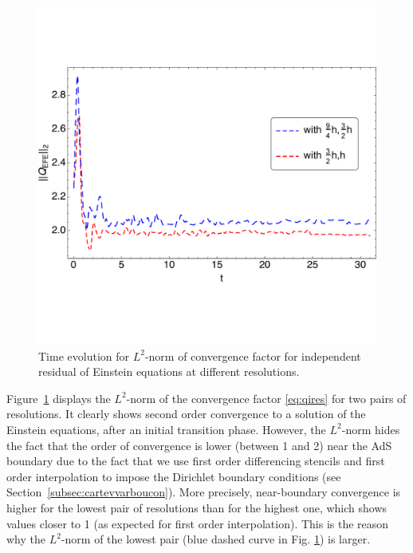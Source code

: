\documentclass[a4paper,11pt]{article}
\numberwithin{equation}{section}
\begin{document}
\begin{figure}[t!]
        \centering
        \includegraphics[width=5.0in,clip=true]{plots/timeseries/L2norm_iresallconvergence/fullplottL2normdim2boundedrescaledconvergenceiresallallres.pdf}
\parbox{5.0in}{\caption{Time evolution for $L^2$-norm of convergence factor for independent residual of Einstein equations at different resolutions.
        }\label{fig:L2norm_iresallconvergence-crop}}
\end{figure}

Figure~\ref{fig:L2norm_iresallconvergence-crop} displays the $L^2$-norm of the convergence factor \eqref{eq:qires} for two pairs of resolutions. It clearly shows second order convergence to a solution of the Einstein equations, after an initial transition phase. However, the $L^2$-norm hides the fact that the order of convergence is lower (between 1 and 2) near the AdS boundary due to the fact that we use first order differencing stencils and first order interpolation to impose the Dirichlet boundary conditions (see Section~\ref{subsec:cartevvarboucon}). More precisely, near-boundary convergence is higher for the lowest pair of resolutions than for the highest one, which shows values closer to 1 (as expected for first order interpolation). This is the reason why the $L^2$-norm of the lowest pair (blue dashed curve in Fig. \ref{fig:L2norm_iresallconvergence-crop}) is larger.





\end{document}
